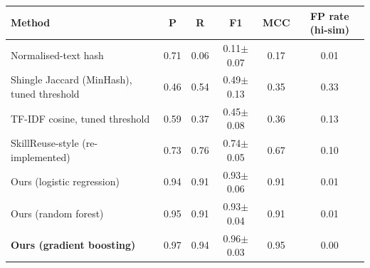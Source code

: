 \begin{tabular}{lccccc}
\toprule
Method & P & R & F1 & MCC & FP rate (hi-sim) \\
\midrule
Normalised-text hash & 0.71 & 0.06 & 0.11$\pm$0.07 & 0.17 & 0.01 \\
Shingle Jaccard (MinHash), tuned threshold & 0.46 & 0.54 & 0.49$\pm$0.13 & 0.35 & 0.33 \\
TF-IDF cosine, tuned threshold & 0.59 & 0.37 & 0.45$\pm$0.08 & 0.36 & 0.13 \\
SkillReuse-style (re-implemented) & 0.73 & 0.76 & 0.74$\pm$0.05 & 0.67 & 0.10 \\
\midrule
Ours (logistic regression) & 0.94 & 0.91 & 0.93$\pm$0.06 & 0.91 & 0.01 \\
Ours (random forest) & 0.95 & 0.91 & 0.93$\pm$0.04 & 0.91 & 0.01 \\
\textbf{Ours (gradient boosting)} & 0.97 & 0.94 & 0.96$\pm$0.03 & 0.95 & 0.00 \\
\bottomrule
\end{tabular}
